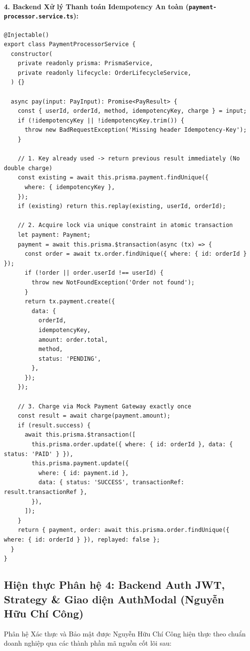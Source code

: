\documentclass[a4paper]{article}
\begin{document}
\paragraph{4. Backend Xử lý Thanh toán Idempotency An toàn (\texttt{payment-processor.service.ts}):}
\begin{lstlisting}[caption={Idempotency handling in PaymentProcessorService}]
@Injectable()
export class PaymentProcessorService {
  constructor(
    private readonly prisma: PrismaService,
    private readonly lifecycle: OrderLifecycleService,
  ) {}

  async pay(input: PayInput): Promise<PayResult> {
    const { userId, orderId, method, idempotencyKey, charge } = input;
    if (!idempotencyKey || !idempotencyKey.trim()) {
      throw new BadRequestException('Missing header Idempotency-Key');
    }

    // 1. Key already used -> return previous result immediately (No double charge)
    const existing = await this.prisma.payment.findUnique({
      where: { idempotencyKey },
    });
    if (existing) return this.replay(existing, userId, orderId);

    // 2. Acquire lock via unique constraint in atomic transaction
    let payment: Payment;
    payment = await this.prisma.$transaction(async (tx) => {
      const order = await tx.order.findUnique({ where: { id: orderId } });
      if (!order || order.userId !== userId) {
        throw new NotFoundException('Order not found');
      }
      return tx.payment.create({
        data: {
          orderId,
          idempotencyKey,
          amount: order.total,
          method,
          status: 'PENDING',
        },
      });
    });

    // 3. Charge via Mock Payment Gateway exactly once
    const result = await charge(payment.amount);
    if (result.success) {
      await this.prisma.$transaction([
        this.prisma.order.update({ where: { id: orderId }, data: { status: 'PAID' } }),
        this.prisma.payment.update({
          where: { id: payment.id },
          data: { status: 'SUCCESS', transactionRef: result.transactionRef },
        }),
      ]);
    }
    return { payment, order: await this.prisma.order.findUnique({ where: { id: orderId } }), replayed: false };
  }
}
\end{lstlisting}

\subsection{Hiện thực Phân hệ 4: Backend Auth JWT, Strategy \& Giao diện AuthModal (Nguyễn Hữu Chí Công)}
Phân hệ Xác thực và Bảo mật được Nguyễn Hữu Chí Công hiện thực theo chuẩn doanh nghiệp qua các thành phần mã nguồn cốt lõi sau:
\end{document}
